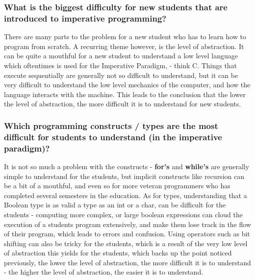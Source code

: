 \subsubsection{What is the biggest difficulty for new students that are introduced to imperative programming?}

There are many parts to the problem for a new student who has to learn how to program from scratch. A recurring theme however, is the level of abstraction. It can be quite a mouthful for a new student to understand a low level language which oftentimes is used for the Imperative Paradigm, - think C. Things that execute sequentially are generally not so difficult to understand, but it can be very difficult to understand the low level mechanics of the computer, and how the language interacts with the machine. This leads to the conclusion that the lower the level of abstraction, the more difficult it is to understand for new students.

\subsubsection{Which programming constructs / types are the most difficult for students to understand (in the imperative paradigm)?}

It is not so much a problem with the constructs - \textbf{for's} and \textbf{while's} are generally simple to understand for the students, but implicit constructs like recursion can be a bit of a mouthful, and even so for more veteran programmers who has completed several semesters in the education. As for types, understanding that a Boolean type is as valid a type as an int or a char, can be difficult for the students - computing more complex, or large boolean expressions can cloud the execution of a students program extensively, and make them lose track in the flow of their program, which leads to errors and confusion. Using operators such as bit shifting can also be tricky for the students, which is a result of the very low level of abstraction this yields for the students, which backs up the point noticed previously, the lower the level of abstraction, the more difficult it is to understand - the higher the level of abstraction, the easier it is to understand.
